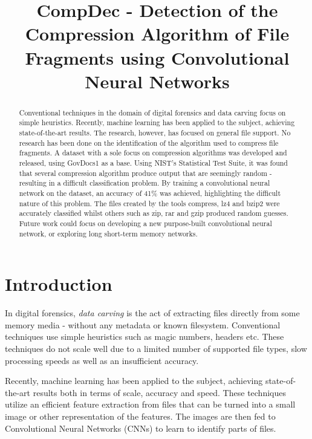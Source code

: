 \documentclass[conference]{IEEEtran}
\begin{document}
\title{CompDec - Detection of the Compression Algorithm of File Fragments using Convolutional Neural Networks}

\author{
}

\maketitle

\begin{abstract}
    Conventional techniques in the domain of digital forensics and data carving focus on simple heuristics. Recently, machine learning has been applied to the subject, achieving state-of-the-art results. The research, however, has focused on general file support. No research has been done on the identification of the algorithm used to compress file fragments. A dataset with a sole focus on compression algorithms was developed and released, using GovDocs1 as a base. Using NIST's Statistical Test Suite, it was found that several compression algorithm produce output that are seemingly random - resulting in a difficult classification problem. By training a convolutional neural network on the dataset, an accuracy of 41\% was achieved, highlighting the difficult nature of this problem. The files created by the tools compress, lz4 and bzip2 were accurately classified whilst others such as zip, rar and gzip produced random guesses. Future work could focus on developing a new purpose-built convolutional neural network, or exploring long short-term memory networks.
\end{abstract}

\section{Introduction}

In digital forensics, \textit{data carving} is the act of extracting files directly from some memory media - without any metadata or known filesystem. Conventional techniques use simple heuristics such as magic numbers, headers etc. These techniques do not scale well due to a limited number of supported file types, slow processing speeds as well as an insufficient accuracy\cite{chen2018}.

Recently, machine learning has been applied to the subject, achieving state-of-the-art results both in terms of scale, accuracy and speed. These techniques utilize an efficient feature extraction from files that can be turned into a small image or other representation of the features. The images are then fed to Convolutional Neural Networks (CNNs) to learn to identify parts of files.
\end{document}

